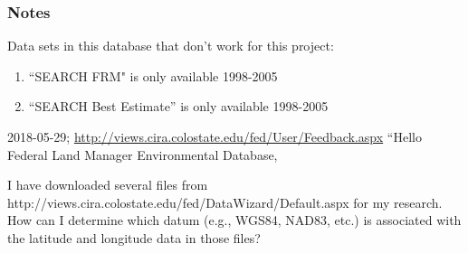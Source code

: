 
\subsubsection*{Notes}

Data sets in this database that don't work for this project:
\begin{enumerate}
\item ``SEARCH FRM" is only available 1998-2005
\item ``SEARCH Best Estimate'' is only available 1998-2005
\end{enumerate}

2018-05-29; \url{http://views.cira.colostate.edu/fed/User/Feedback.aspx}
``Hello Federal Land Manager Environmental Database,

I have downloaded several files from http://views.cira.colostate.edu/fed/DataWizard/Default.aspx for my research. How can I determine which datum (e.g., WGS84, NAD83, etc.) is associated with the latitude and longitude data in those files?

